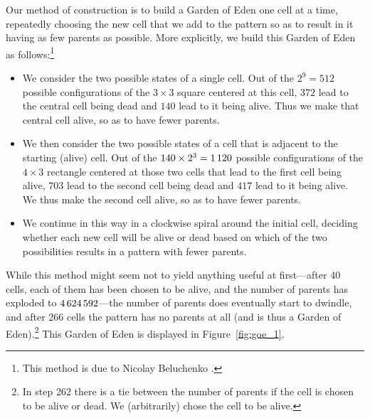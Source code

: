 Our method of construction is to build a Garden of Eden one cell at a time, repeatedly choosing the new cell that we add to the pattern so as to result in it having as few parents as possible. More explicitly, we build this Garden of Eden as follows:\footnote{This method is due to Nicolay Beluchenko \cite{A196447}.}\medskip

\begin{itemize}
	\item We consider the two possible states of a single cell. Out of the $2^9 = 512$ possible configurations of the $3 \times 3$ square centered at this cell, $372$ lead to the central cell being dead and $140$ lead to it being alive. Thus we make that central cell alive, so as to have fewer parents.\smallskip
	
	\item We then consider the two possible states of a cell that is adjacent to the starting (alive) cell. Out of the $140 \times 2^3 = 1{\,}120$ possible configurations of the $4 \times 3$ rectangle centered at those two cells that lead to the first cell being alive, $703$ lead to the second cell being dead and $417$ lead to it being alive. We thus make the second cell alive, so as to have fewer parents.\smallskip
	
	\item We continue in this way in a clockwise spiral around the initial cell, deciding whether each new cell will be alive or dead based on which of the two possibilities results in a pattern with fewer parents.\medskip
\end{itemize}

While this method might seem not to yield anything useful at first---after 40 cells, each of them has been chosen to be alive, and the number of parents has exploded to $4{\,}624{\,}592$---the number of parents does eventually start to dwindle, and after 266 cells the pattern has no parents at all (and is thus a Garden of Eden).\footnote{In step 262 there is a tie between the number of parents if the cell is chosen to be alive or dead. We (arbitrarily) chose the cell to be alive.} This Garden of Eden is displayed in Figure~\ref{fig:goe_1}.

